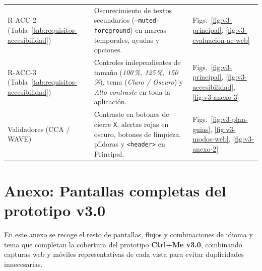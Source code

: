 \begin{table}[H]
\begin{tabularx}{\textwidth}{@{}l X l@{}}
    R-ACC-2 (Tabla~\ref{tab:requisitos-accesibilidad}) & Oscurecimiento de textos secundarios (\texttt{--muted-foreground}) en marcas temporales, ayudas y opciones. & Figs.~\ref{fig:v3-principal}, \ref{fig:v3-evaluacion-ac-web} \\
    R-ACC-3 (Tabla~\ref{tab:requisitos-accesibilidad}) & Controles independientes de tamaño (\textit{100\,\%, 125\,\%, 150\,\%}), tema (\textit{Claro / Oscuro}) y \textit{Alto contraste} en toda la aplicación. & Figs.~\ref{fig:v3-principal}, \ref{fig:v3-accesibilidad}, \ref{fig:v3-anexo-3} \\
    Validadores (CCA / WAVE) & Contraste en botones de cierre \texttt{X}, alertas rojas en oscuro, botones de limpieza, píldoras y \texttt{<header>} en Principal. & Figs.~\ref{fig:v3-plan-guias}, \ref{fig:v3-modos-web}, \ref{fig:v3-anexo-2} \\
    \bottomrule
  \end{tabularx}
\end{table}

\newpage
\section{Anexo: Pantallas completas del prototipo v3.0}
\label{sec:anexo-v3}

En este anexo se recoge el resto de pantallas, flujos y combinaciones de idioma y tema que completan la cobertura del prototipo \textbf{Ctrl+Me v3.0}, combinando capturas web y móviles representativas de cada vista para evitar duplicidades innecesarias.

